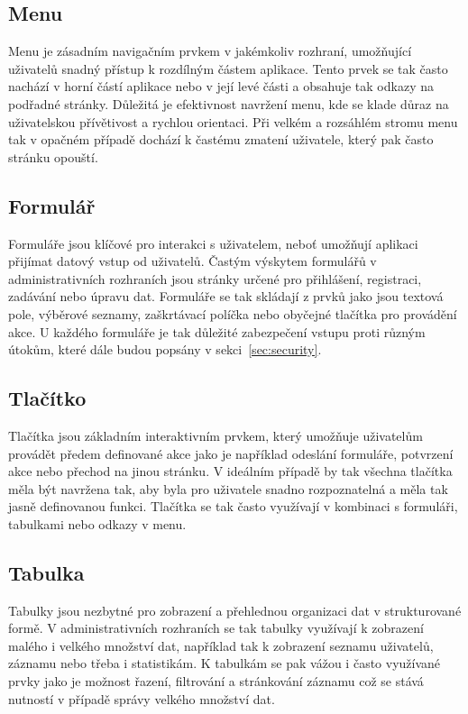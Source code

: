 \subsection*{Menu}
\label{subsec:admin-tags-menu}
Menu je zásadním navigačním prvkem v jakémkoliv rozhraní, umožňující uživatelů snadný přístup k rozdílným částem aplikace. Tento prvek se tak často nachází v horní částí aplikace nebo v její levé části a obsahuje tak odkazy na podřadné stránky. Důležitá je efektivnost navržení menu, kde se klade důraz na uživatelskou přívětivost a rychlou orientaci. Při velkém a rozsáhlém stromu menu tak v opačném případě dochází k častému zmatení uživatele, který pak často stránku opouští.

\subsection*{Formulář}
\label{subsec:admin-tags-form}
Formuláře jsou klíčové pro interakci s uživatelem, neboť umožňují aplikaci přijímat datový vstup od uživatelů. Častým výskytem formulářů v administrativních rozhraních jsou stránky určené pro přihlášení, registraci, zadávání nebo úpravu dat. Formuláře se tak skládají z prvků jako jsou textová pole, výběrové seznamy, zaškrtávací políčka nebo obyčejné tlačítka pro provádění akce. U každého formuláře je tak důležité zabezpečení vstupu proti různým útokům, které dále budou popsány v sekci~\ref{sec:security}.

\subsection*{Tlačítko}
\label{subsec:admin-tags-button}
Tlačítka jsou základním interaktivním prvkem, který umožňuje uživatelům provádět předem definované akce jako je například odeslání formuláře, potvrzení akce nebo přechod na jinou stránku. V ideálním případě by tak všechna tlačítka měla být navržena tak, aby byla pro uživatele snadno rozpoznatelná a měla tak jasně definovanou funkci. Tlačítka se tak často využívají v kombinaci s formuláři, tabulkami nebo odkazy v menu.

\subsection*{Tabulka}
\label{subsec:admin-tags-table}
Tabulky jsou nezbytné pro zobrazení a přehlednou organizaci dat v strukturované formě. V administrativních rozhraních se tak tabulky využívají k zobrazení malého i velkého množství dat, například tak k zobrazení seznamu uživatelů, záznamu nebo třeba i statistikám. K tabulkám se pak vážou i často využívané prvky jako je možnost řazení, filtrování a stránkování záznamu což se stává nutností v případě správy velkého množství dat.

